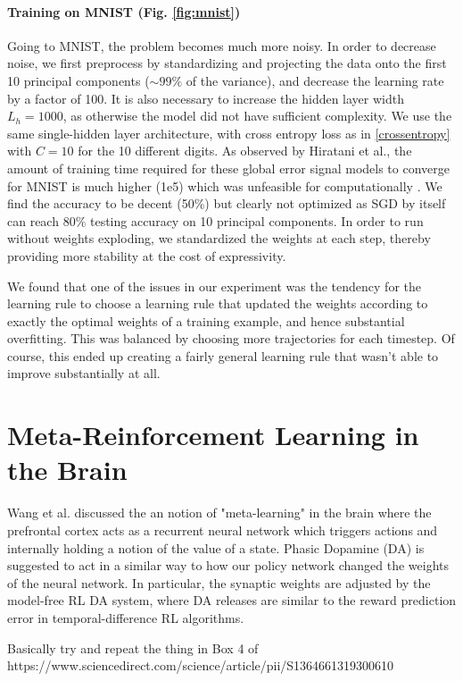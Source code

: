 \documentclass{article}
\begin{document}
\paragraph{Training on MNIST (Fig. \ref{fig:mnist})} Going to MNIST, the problem becomes much more noisy. 
In order to decrease noise, we first preprocess by standardizing and projecting the
data onto the first 10 principal components ($\sim99\%$ of the variance), and decrease the learning rate 
by a factor of 100. It is also necessary to increase the hidden layer width $L_h = 1000$, as otherwise the model did not
have sufficient complexity. We use the same single-hidden layer architecture, with cross entropy loss as in \ref{crossentropy} with $C=10$ for the 10 different digits. As observed by Hiratani et al., the amount of training time required 
for these global error signal models to converge for MNIST is much higher (1e5) which was unfeasible for computationally \cite{hiratani2022on}.
We find the accuracy to be decent (50\%) but clearly not optimized as SGD by itself can reach $80\%$ testing accuracy on 10
principal components. In order to run without weights exploding, we standardized the weights at each step, thereby providing more stability at the cost of expressivity. 

We found that one of the issues in our experiment was the tendency for the learning rule to choose a learning rule that updated the weights according to exactly the optimal weights of a training example, and hence substantial overfitting. This was balanced
by choosing more trajectories for each timestep. Of course, this ended up creating a fairly general learning rule that wasn't able to improve substantially at all. 
\section{Meta-Reinforcement Learning in the Brain}

Wang et al. discussed the 
an notion of "meta-learning" in the brain where the prefrontal cortex acts as a recurrent neural network which triggers actions
and internally holding a notion of the value of a state. Phasic Dopamine (DA) is suggested to act in a similar way to
how our policy network changed the weights of the neural network. In particular, the synaptic weights are adjusted
by the model-free RL DA system, where DA releases are similar to the reward prediction error in temporal-difference RL algorithms.


Basically try and repeat the thing in Box 4 of https://www.sciencedirect.com/science/article/pii/S1364661319300610
\end{document}
